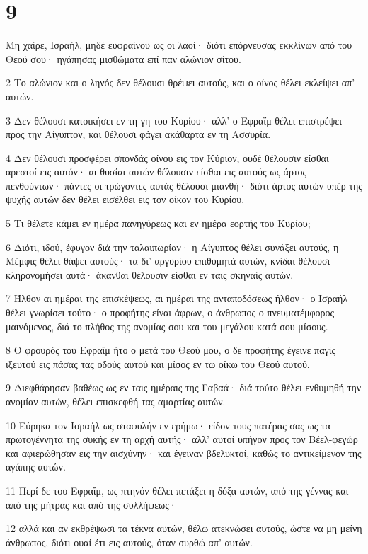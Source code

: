 \chapter{9}

\par Μη χαίρε, Ισραήλ, μηδέ ευφραίνου ως οι λαοί· διότι επόρνευσας εκκλίνων από του Θεού σου· ηγάπησας μισθώματα επί παν αλώνιον σίτου.
\par 2 Το αλώνιον και ο ληνός δεν θέλουσι θρέψει αυτούς, και ο οίνος θέλει εκλείψει απ' αυτών.
\par 3 Δεν θέλουσι κατοικήσει εν τη γη του Κυρίου· αλλ' ο Εφραΐμ θέλει επιστρέψει προς την Αίγυπτον, και θέλουσι φάγει ακάθαρτα εν τη Ασσυρία.
\par 4 Δεν θέλουσι προσφέρει σπονδάς οίνου εις τον Κύριον, ουδέ θέλουσιν είσθαι αρεστοί εις αυτόν· αι θυσίαι αυτών θέλουσιν είσθαι εις αυτούς ως άρτος πενθούντων· πάντες οι τρώγοντες αυτάς θέλουσι μιανθή· διότι άρτος αυτών υπέρ της ψυχής αυτών δεν θέλει εισέλθει εις τον οίκον του Κυρίου.
\par 5 Τι θέλετε κάμει εν ημέρα πανηγύρεως και εν ημέρα εορτής του Κυρίου;
\par 6 Διότι, ιδού, έφυγον διά την ταλαιπωρίαν· η Αίγυπτος θέλει συνάξει αυτούς, η Μέμφις θέλει θάψει αυτούς· τα δι' αργυρίου επιθυμητά αυτών, κνίδαι θέλουσι κληρονομήσει αυτά· άκανθαι θέλουσιν είσθαι εν ταις σκηναίς αυτών.
\par 7 Ήλθον αι ημέραι της επισκέψεως, αι ημέραι της ανταποδόσεως ήλθον· ο Ισραήλ θέλει γνωρίσει τούτο· ο προφήτης είναι άφρων, ο άνθρωπος ο πνευματέμφορος μαινόμενος, διά το πλήθος της ανομίας σου και του μεγάλου κατά σου μίσους.
\par 8 Ο φρουρός του Εφραΐμ ήτο ο μετά του Θεού μου, ο δε προφήτης έγεινε παγίς ιξευτού εις πάσας τας οδούς αυτού και μίσος εν τω οίκω του Θεού αυτού.
\par 9 Διεφθάρησαν βαθέως ως εν ταις ημέραις της Γαβαά· διά τούτο θέλει ενθυμηθή την ανομίαν αυτών, θέλει επισκεφθή τας αμαρτίας αυτών.
\par 10 Εύρηκα τον Ισραήλ ως σταφυλήν εν ερήμω· είδον τους πατέρας σας ως τα πρωτογέννητα της συκής εν τη αρχή αυτής· αλλ' αυτοί υπήγον προς τον Βέελ-φεγώρ και αφιερώθησαν εις την αισχύνην· και έγειναν βδελυκτοί, καθώς το αντικείμενον της αγάπης αυτών.
\par 11 Περί δε του Εφραΐμ, ως πτηνόν θέλει πετάξει η δόξα αυτών, από της γέννας και από της μήτρας και από της συλλήψεως·
\par 12 αλλά και αν εκθρέψωσι τα τέκνα αυτών, θέλω ατεκνώσει αυτούς, ώστε να μη μείνη άνθρωπος, διότι ουαί έτι εις αυτούς, όταν συρθώ απ' αυτών.
